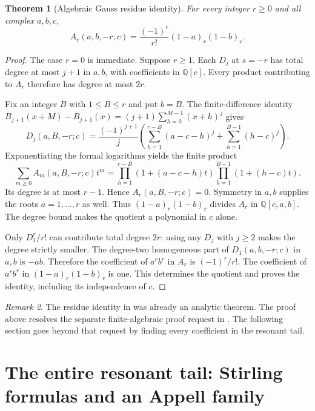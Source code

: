\documentclass[11pt]{article}
\numberwithin{equation}{section}
\newtheorem{theorem}{Theorem}[section]
\theoremstyle{definition}\newtheorem{definition}[theorem]{Definition}
\theoremstyle{remark}\newtheorem{remark}[theorem]{Remark}
\newcommand{\Q}{\mathbb Q}
\begin{document}
\begin{theorem}[Algebraic Gauss residue identity]
\label{agrc:residue}
For every integer $r\geq0$ and all complex $a,b,c$,
\begin{equation}\label{agrc:residue-formula}
 \boxed{\displaystyle
 A_r(a,b,-r;c)=\frac{(-1)^r}{r!}(1-a)_r(1-b)_r.}
\end{equation}
\end{theorem}
\begin{proof}
The case $r=0$ is immediate. Suppose $r\geq1$. Each $D_j$ at $s=-r$
has total degree at most $j+1$ in $a,b$, with coefficients in $\Q[c]$.
Every product contributing to $A_r$ therefore has degree at most $2r$.

Fix an integer $B$ with $1\leq B\leq r$ and put $b=B$.
The finite-difference identity
$B_{j+1}(x+M)-B_{j+1}(x)=(j+1)\sum_{h=0}^{M-1}(x+h)^j$
gives
\begin{equation}\label{agrc:D-root}
 D_j(a,B,-r;c)=\frac{(-1)^{j+1}}j
 \left(\sum_{h=1}^{r-B}(a-c-h)^j+
       \sum_{h=1}^{B-1}(h-c)^j\right).
\end{equation}
Exponentiating the formal logarithms yields the finite product
\begin{equation}\label{agrc:collapse}
 \sum_{m\geq0}A_m(a,B,-r;c)t^m
 =\prod_{h=1}^{r-B}(1+(a-c-h)t)
       \prod_{h=1}^{B-1}(1+(h-c)t).
\end{equation}
Its degree is at most $r-1$. Hence $A_r(a,B,-r;c)=0$.
Symmetry in $a,b$ supplies the roots $a=1,\ldots,r$ as well.
Thus $(1-a)_r(1-b)_r$ divides $A_r$ in $\Q[c,a,b]$.
The degree bound makes the quotient a polynomial in $c$ alone.

Only $D_1^r/r!$ can contribute total degree $2r$: using any $D_j$ with
$j\geq2$ makes the degree strictly smaller. The degree-two homogeneous
part of $D_1(a,b,-r;c)$ in $a,b$ is $-ab$. Therefore the coefficient
of $a^rb^r$ in $A_r$ is $(-1)^r/r!$. The coefficient of $a^rb^r$ in
$(1-a)_r(1-b)_r$ is one. This determines the quotient and proves the
identity, including its independence of $c$.
\end{proof}

\begin{remark}
The residue identity in \cite{repo-gauss} was already an analytic theorem.
The proof above resolves the separate finite-algebraic proof request in
\cite{repo-agenda}. The following section goes beyond that request by
finding every coefficient in the resonant tail.
\end{remark}

\section{The entire resonant tail: Stirling formulas and an Appell family}
\label{agrc:tail-section}
\end{document}
